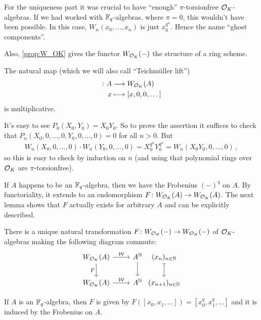 \documentclass[a4paper, 10pt, oneside, DIV=9, chapterprefix=true, numbers=enddot,bibliography=totoc]{scrbook}
\begin{document}
\begin{urem}
	\begin{numerate}
		\item For the uniqueness part it was crucial to have \enquote{enough} $\pi$-torsionfree $\mathcal{O}_K$-algebras. If we had worked with $\mathbb{F}_q$-algebras, where $\pi=0$, this wouldn't have been possible. In this case, $W_n(x_0,\dotsc,x_n)$ is just $x_0^{q^n}$. Hence the name \enquote{ghost components}.
		
		\item Also, \cref{prop:W_OK} gives the functor $W_{\mathcal{O}_K}(-)$ the structure of a ring scheme.
	\end{numerate}
\end{urem}	
\begin{lem}\label{lem:W_OKTeichmüller}
	The natural map (which we will also call \enquote{Teichmüller lift})
	\begin{align*}
		[-]\colon A&\morphism W_{\Oo_K}(A)\\
		x&\longmapsto [x,0,0,\dotsc]
	\end{align*}
	is multiplicative.
\end{lem}
\begin{proof*}
	It's easy to see $P_0(X_0,Y_0)=X_0Y_0$. So to prove the assertion it suffices to check that $P_n(X_0,0,\dotsc,0,Y_0,0,\dotsc,0)=0$ for all $n>0$. But
	\begin{align*}
		W_n(X_0,0,\dotsc,0)\cdot W_n(Y_0,0,\dotsc,0)=X_0^{q^n}Y_0^{q^n}=W_n(X_0Y_0,0,\dotsc,0)\,,
	\end{align*}
	so this is easy to check by induction on $n$ (and using that polynomial rings over $\mathcal{O}_K$ are $\pi$-torsionfree).
\end{proof*}
If $A$ happens to be an $\mathbb{F}_q$-algebra, then we have the Frobenius $(-)^q$ on $A$. By functoriality, it extends to an endomorphism $F\colon W_{\Oo_K}(A)\morphism W_{\Oo_K}(A)$. The next lemma shows that $F$ actually exists for arbitrary $A$ and can be explicitly described.
\begin{lem}\label{lem:WittFrob}
	\begin{numerate}
		\item There is a unique natural transformation $F\colon W_{\Oo_K}(-)\morphism W_{\Oo_K}(-)$ of $\mathcal{O}_K$-algebras making the following diagram commute:
		\begin{equation*}
			\begin{tikzcd}
				W_{\Oo_K}(A)\rar["\Ww"]\dar["F"{swap}] & A^\IN\dar &[-2.4em] (x_n)_{n\in\IN}\dar[|->]\\
				W_{\Oo_K}(A)\rar["\Ww"] & A^\IN &[-2.4em] (x_{n+1})_{n\in \IN}
			\end{tikzcd}
		\end{equation*}
		\item If $A$ is an $\mathbb{F}_q$-algebra, then $F$ is given by $F([x_0,x_1,\dotsc])=[x_0^q,x_1^q,\dotsc]$ and it is induced by the Frobenius on $A$.
	\end{numerate}
\end{lem}
\end{document}
